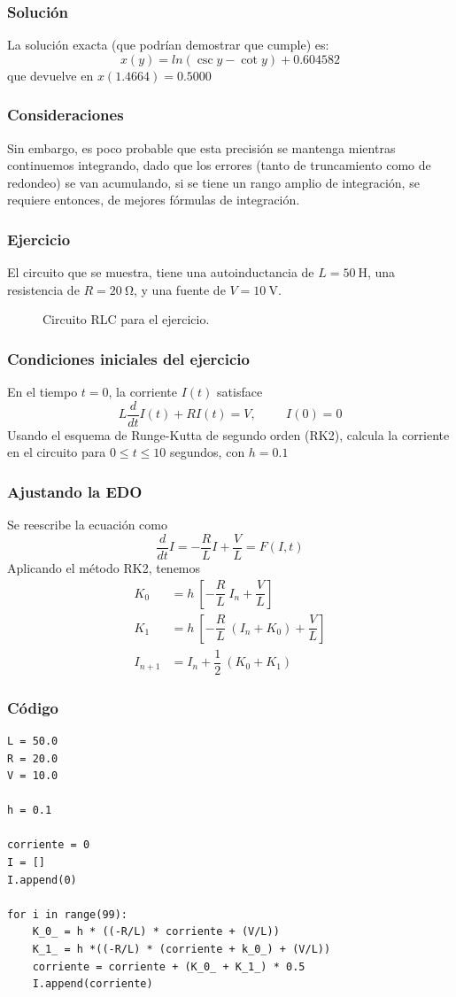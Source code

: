 \begin{frame}
\frametitle{Solución}
La solución exacta (que podrían demostrar que cumple) es:
\[ x(y) = ln(\csc y - \cot y) + 0.604582 \]
que devuelve en $x(1.4664) = 0.5000$
\end{frame}
\begin{frame}
\frametitle{Consideraciones}
Sin embargo, es poco probable que esta precisión se mantenga mientras continuemos integrando, dado que los errores (tanto de truncamiento como de redondeo) se van acumulando, si se tiene un rango amplio de integración, se requiere entonces, de mejores fórmulas de integración.
\end{frame}
\begin{frame}[fragile]
\frametitle{Ejercicio}
El circuito que se muestra, tiene una autoinductancia de $L = \SI{50}{\henry}$, una resistencia de $R = \SI{20}{\ohm}$, y una fuente de $V = \SI{10}{\volt}$.
\begin{figure}
    \centering
    
    \caption{Circuito RLC para el ejercicio.}
\end{figure}
\end{frame}
\begin{frame}
\frametitle{Condiciones iniciales del ejercicio}
En el tiempo $t = 0$, la corriente $I(t)$ satisface
\[L \dfrac{d}{dt} I(t) + RI(t) = V, \hspace{1cm} I(0) = 0\]
Usando el esquema de Runge-Kutta de segundo orden (RK2), calcula la corriente en el circuito para $0\leq t \leq 10$ segundos, con $h = 0.1$
\end{frame}
\begin{frame}
\frametitle{Ajustando la EDO}
Se reescribe la ecuación como
\[\dfrac{d}{dt} I = -\dfrac{R}{L} I + \dfrac{V}{L} = F(I, t)\]
Aplicando el método RK2, tenemos
\begin{align*}
K_{0} &= h \: \left[-\dfrac{R}{L} \: I_{n} + \dfrac{V}{L} \right] \\
K_{1} &= h \: \left[-\dfrac{R}{L} \: (I_{n} + K_{0}) + \dfrac{V}{L} \right] \\
I_{n + 1} &= I_{n} + \dfrac{1}{2} \: (K_{0} + K_{1})
\end{align*}
\end{frame}
\begin{frame}
\frametitle{Código}
\begin{lstlisting}[caption=Código para el circuito RLC, style=FormattedNumber, basicstyle=\linespread{1.1}\ttfamily=\small, columns=fullflexible]
L = 50.0
R = 20.0
V = 10.0

h = 0.1

corriente = 0
I = []
I.append(0)

for i in range(99):
    K_0_ = h * ((-R/L) * corriente + (V/L))
    K_1_ = h *((-R/L) * (corriente + k_0_) + (V/L))
    corriente = corriente + (K_0_ + K_1_) * 0.5
    I.append(corriente)
\end{lstlisting}
\end{frame}
